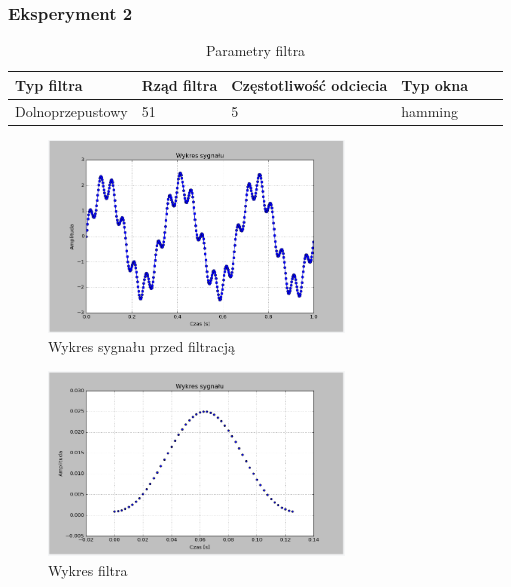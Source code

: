 \documentclass{article}
\begin{document}
{        \subsubsection{Eksperyment 2} {
            \begin{table}[h!]
            \centering
            \begin{tabular}{|l|l|l|l|l|l|}
            \hline
            Typ filtra & Rząd filtra & Częstotliwość odciecia & Typ okna  \\\hline
            Dolnoprzepustowy & 51 & 5 & hamming     \\\hline
            \end{tabular}
            \caption{Parametry filtra}
            \end{table}
            \begin{figure}[h!]
                \centering
                \includegraphics[width=0.7\textwidth]{img/sig.png}
                \caption{Wykres sygnału przed filtracją}
            \end{figure}
            \begin{figure}[h!]
                \centering
                \includegraphics[width=0.7\textwidth]{img/fil3.png}
                \caption{Wykres filtra}
            \end{figure}

}}
\end{document}
